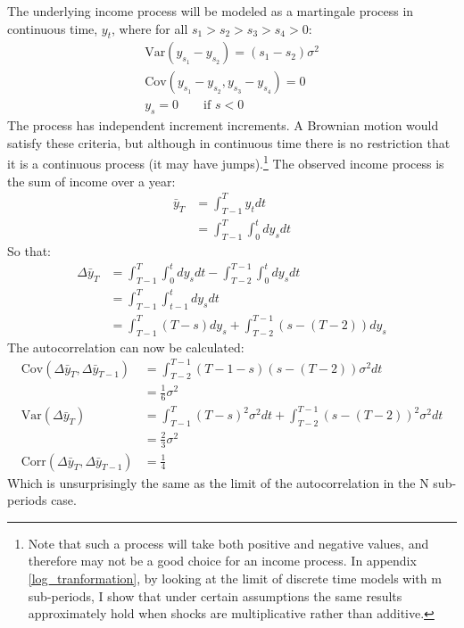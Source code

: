 \documentclass[titlepage]{\econtex}\newcommand{\texname}{BPP_TimeAgg}
\begin{document}
The underlying income process will be modeled as a martingale process in continuous time, $y_t$, where for all  $s_1>s_2>s_3>s_4>0$:
\begin{align*}
\mathrm{Var}(y_{s_1}-y_{s_2})=(s_1-s_2)\sigma^2 \\
\mathrm{Cov}(y_{s_1}-y_{s_2},y_{s_3}-y_{s_4}) = 0 \\
y_s = 0 \qquad \text{if } s<0
\end{align*}
The process has independent increment increments. A Brownian motion would satisfy these criteria, but although in continuous time there is no restriction that it is a continuous process (it may have jumps).\footnote{Note that such a process will take both positive and negative values, and therefore may not be a good choice for an income process. In appendix \ref{log_tranformation}, by looking at the limit of discrete time models with m sub-periods, I show that under certain assumptions the same results approximately hold when shocks are multiplicative rather than additive.} The observed income process is the sum of income over a year:
\begin{align*}
\bar{y}_T &= \int_{T-1}^{T} y_t dt \\
&= \int_{T-1}^{T} \int_{0}^{t} dy_s dt 
\end{align*}
So that:
\begin{align*}
\Delta \bar{y}_T &= \int_{T-1}^{T} \int_{0}^{t} dy_s dt - \int_{T-2}^{T-1} \int_{0}^{t} dy_s dt \\
&= \int_{T-1}^{T} \int_{t-1}^{t} dy_s dt \\
&= \int_{T-1}^{T} (T-s) dy_s + \int_{T-2}^{T-1} (s-(T-2)) dy_s 
\end{align*}
The autocorrelation can now be calculated:
\begin{align*}
\mathrm{Cov}(\Delta \bar{y}_T,\Delta \bar{y}_{T-1}) &=  \int_{T-2}^{T-1} (T-1-s)(s-(T-2)) \sigma^2 dt \\
&= \frac{1}{6}\sigma^2 \\
\mathrm{Var}(\Delta \bar{y}_T) &= \int_{T-1}^{T} (T-s)^2 \sigma^2 dt + \int_{T-2}^{T-1} (s-(T-2))^2 \sigma^2 dt \\
&= \frac{2}{3}\sigma^2 \\
\mathrm{Corr}(\Delta \bar{y}_T,\Delta \bar{y}_{T-1}) &= \frac{1}{4}
\end{align*}
Which is unsurprisingly the same as the limit of the autocorrelation in the N sub-periods case.
\end{document}
